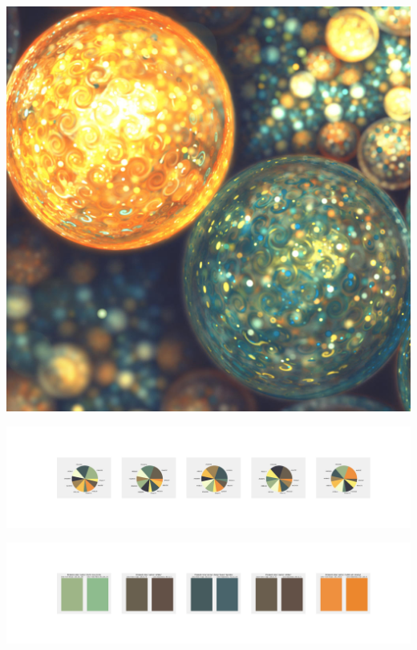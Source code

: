 \documentclass[11pt]{article}
\begin{document}
\begin{landscape}
    \begin{center}
    \includegraphics[width=\textwidth]{./nbimg/file (361).jpg}
    \end{center}

    \begin{center}
    \includegraphics[width=250mm]{./nbimg/pie-291.jpg}
    \end{center}

    \begin{center}
    \includegraphics[width=250mm]{./nbimg/peak-291.jpg}
    \end{center}
    


\end{landscape}
\end{document}
